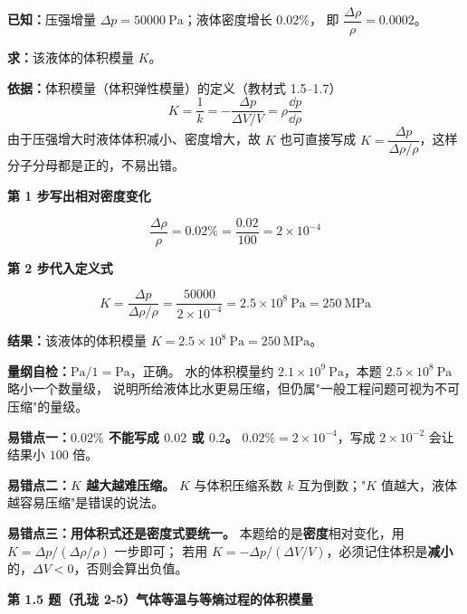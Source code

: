 \begin{jie}
\textbf{已知：}压强增量 $\Delta p=50000\ \mathrm{Pa}$；液体密度增长 $0.02\%$，
即 $\dfrac{\Delta\rho}{\rho}=0.0002$。

\textbf{求：}该液体的体积模量 $K$。

\textbf{依据：}体积模量（体积弹性模量）的定义（教材式 1.5--1.7）
\[ K=\frac{1}{k}=-\frac{\Delta p}{\Delta V/V}=\rho\frac{\dd p}{\dd\rho} \]
由于压强增大时液体体积减小、密度增大，故 $K$ 也可直接写成
$K=\dfrac{\Delta p}{\Delta\rho/\rho}$，这样分子分母都是正的，不易出错。

\textbf{第 1 步\quad 写出相对密度变化}

\[ \frac{\Delta\rho}{\rho}=0.02\%=\frac{0.02}{100}=2\times10^{-4} \]

\textbf{第 2 步\quad 代入定义式}

\[ K=\frac{\Delta p}{\Delta\rho/\rho}=\frac{50000}{2\times10^{-4}}
     =2.5\times10^{8}\ \mathrm{Pa}=250\ \mathrm{MPa} \]

\textbf{结果：}该液体的体积模量 $K=2.5\times10^{8}\ \mathrm{Pa}=250\ \mathrm{MPa}$。

\textbf{量纲自检：}$\mathrm{Pa}/1=\mathrm{Pa}$，正确。
水的体积模量约 $2.1\times10^{9}\ \mathrm{Pa}$，本题 $2.5\times10^{8}\ \mathrm{Pa}$ 略小一个数量级，
说明所给液体比水更易压缩，但仍属"一般工程问题可视为不可压缩"的量级。
\end{jie}

\begin{yicuo}
\textbf{易错点一：$0.02\%$ 不能写成 $0.02$ 或 $0.2$。}
$0.02\%=2\times10^{-4}$，写成 $2\times10^{-2}$ 会让结果小 $100$ 倍。

\textbf{易错点二：$K$ 越大越难压缩。}
$K$ 与体积压缩系数 $k$ 互为倒数；"$K$ 值越大，液体越容易压缩"是错误的说法。

\textbf{易错点三：用体积式还是密度式要统一。}
本题给的是\textbf{密度}相对变化，用 $K=\Delta p/(\Delta\rho/\rho)$ 一步即可；
若用 $K=-\Delta p/(\Delta V/V)$，必须记住体积是\textbf{减小}的，$\Delta V<0$，否则会算出负值。
\end{yicuo}

\noindent\textbf{第 1.5 题（孔珑 2-5）\quad 气体等温与等熵过程的体积模量}

